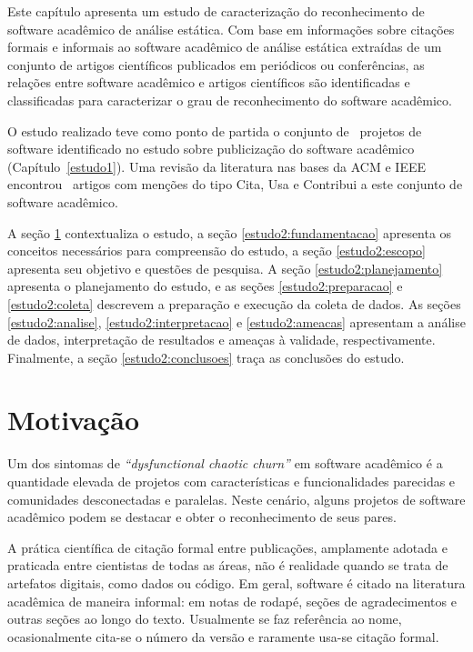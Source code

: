 \label{estudo2}

Este capítulo apresenta um estudo de caracterização do reconhecimento de
software acadêmico de análise estática.  Com base em informações sobre citações
formais e informais ao software acadêmico de análise estática extraídas de um
conjunto de artigos científicos publicados em periódicos ou conferências, as
relações entre software acadêmico e artigos científicos são identificadas e
classificadas para caracterizar o grau de reconhecimento do software acadêmico.

O estudo realizado teve como ponto de partida o conjunto de \SoftwareCount \
projetos de software identificado no estudo sobre publicização do software
acadêmico (Capítulo~\ref{estudo1}).  Uma revisão da literatura nas bases da ACM
e IEEE encontrou \SearchUniqueCount \ artigos com menções do tipo Cita, Usa e
Contribui a este conjunto de software acadêmico.

A seção \ref{estudo2:introducao} contextualiza o estudo,
a seção \ref{estudo2:fundamentacao} apresenta os conceitos necessários para compreensão do estudo,
a seção \ref{estudo2:escopo} apresenta seu objetivo e questões de pesquisa.
A seção \ref{estudo2:planejamento} apresenta o planejamento do estudo, e
as seções \ref{estudo2:preparacao} e \ref{estudo2:coleta} descrevem a preparação e execução da coleta de dados.
As seções \ref{estudo2:analise}, \ref{estudo2:interpretacao} e \ref{estudo2:ameacas}
apresentam a análise de dados, interpretação de resultados e ameaças à validade, respectivamente.
Finalmente, a seção \ref{estudo2:conclusoes} traça as conclusões do estudo.

\section{Motivação} \label{estudo2:introducao} %

Um dos sintomas de 
{\it ``dysfunctional chaotic churn''} \cite{howison2015understanding}
em software acadêmico é a quantidade elevada de projetos 
com características e funcionalidades parecidas
e comunidades desconectadas e paralelas.
Neste cenário, alguns projetos de software acadêmico
podem se destacar e obter o reconhecimento de seus pares.

A prática científica de citação formal entre publicações, amplamente
adotada e praticada entre cientistas de todas as áreas, não é realidade quando
se trata de artefatos digitais, como dados ou código.
Em geral, software é citado na literatura acadêmica
de maneira informal: em notas de rodapé, seções de agradecimentos e outras
seções ao longo do texto. Usualmente se faz referência ao nome, ocasionalmente
cita-se o número da versão e raramente usa-se citação formal.

